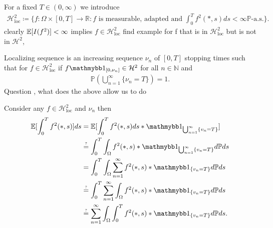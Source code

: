 \begin{definition}[3.11]
 For a fixed $T \in  (0,\infty)$  we introduce 
 \begin{align*}
   \mathcal{H}_{\text{loc}}^2 \coloneqq  \{f : \Omega  \times  [0,T] \to  \mathbb{R} : f \text{ is measurable, adapted and } \int_0^{T} f^2(*,s) ds <\infty   \mathbb{P}\text{-a.s.} \}  
 .\end{align*}
 clearly $\mathbb{E}[I(f^2)] < \infty$  implies $f \in  \mathcal{H}_{\text{loc}}^2$ find example for f that is in $\mathcal{H}_{\text{loc}}^2$ but is not in $\mathcal{H}^2$, 
\end{definition}
\begin{remark}
  Localizing sequence is an increasing sequence $\nu_n$ of $[0,T]$  stopping times such that for $f \in  \mathcal{H}_{\text{loc}}^2$ if $f \cha_{[0,\nu_n]} \in  \mathcal{H}^2$ for all $n \in  \mathbb{N}$ and 
  \begin{align*}
    \mathbb{P}(\bigcup_{n=1}^{\infty} \{\nu_n = T\}   ) = 1
  .\end{align*}
  Question , what does the above allow us to do 
\end{remark}
\begin{example}
  Consider any $f \in  \mathcal{H}_{\text{loc}}^2$  and $\nu_n$ then 
  \begin{align*}
    \E[\int_0^{T} f^2(*,s)] ds  &= \E[\int_{0}^{T} f^2(*,s) ds *\cha_{\bigcup_{n=1}^{\infty} \{v_n = T\}  }]\\
                                &\myS{?}{=}  \int_{0}^{T} \int_{\Omega }  f^2(*,s) *\cha_{\bigcup_{n=1}^{\infty} \{v_n = T\}} d\mathbb{P} ds \\
                                &= \int_0^{T} \int_{\Omega }  \sum_{n=1}^{\infty} f^2(*,s) *\cha_{\{v_n = T\}} d\mathbb{P} ds \\ 
                                &\myS{?}{=}  \int_0^{T}  \sum_{n=1}^{\infty} \int_{\Omega }  f^2(*,s) *\cha_{\{v_n = T\}} d\mathbb{P} ds \\ 
                                &\myS{?}{=}  \sum_{n=1}^{\infty} \int_{\Omega } \int_0^{T}    f^2(*,s) *\cha_{\{v_n = T\}} d\mathbb{P} ds 
  .\end{align*}
\end{example}
